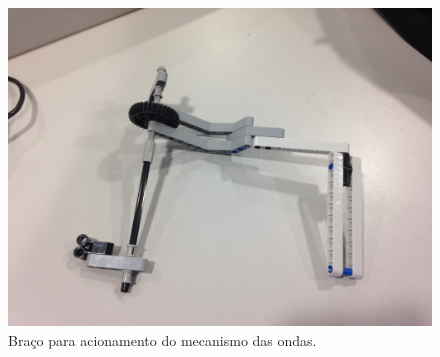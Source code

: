 \documentclass{article}
\begin{document}
	\begin{figure}[h!]
		\includegraphics[width=\linewidth]{../Images/claw_3.JPG}
		\caption{Braço para acionamento do mecanismo das ondas.}
		\label{fig:claw_3}
	\end{figure}
\end{document}
